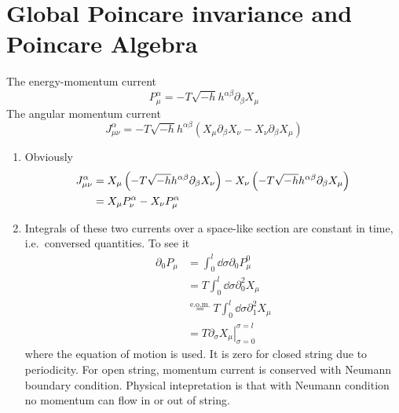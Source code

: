 \section{Global Poincare invariance and Poincare Algebra}
The energy-momentum current
\begin{equation}
	P^\alpha_\mu = - T \sqrt{-h} h^{\alpha \beta} \partial_\beta X_\mu
\end{equation}
The angular momentum current
\begin{equation}
	J^\alpha_{\mu\nu} = - T \sqrt{-h} h^{\alpha\beta} \left( X_\mu \partial_\beta X_\nu - X_\nu \partial_\beta X_\mu \right)
\end{equation}
\begin{enumerate}[label=(\alph*)]
	\item Obviously
		\begin{align}
			J^\alpha_{\mu\nu} &= X_\mu \left( - T \sqrt{-h} h^{\alpha\beta} \partial_\beta X_\nu \right) - X_\nu \left( - T \sqrt{-h} h^{\alpha\beta} \partial_\beta X_\mu \right) \notag \\ 
			&= X_\mu P^\alpha_\nu - X_\nu P^\alpha_\mu 
		\end{align}

	\item 
		Integrals of these two currents over a space-like section are constant in time, i.e.~conversed quantities. To see it
		\begin{align*}
			\partial_0 P_\mu &= \int_0^l \dd{\sigma} \partial_0 P^0_\mu  \\
						&= T \int_0^l \dd{\sigma} \partial_0^2 X_\mu \\
						&\stackrel{\text{e.o.m.}}{=} T \int_0^l \dd{\sigma} \partial_1^2 X_\mu \\
						&= T \left. \partial_\sigma X_\mu \right|_{\sigma=0}^{\sigma=l}
		\end{align*}
		where the equation of motion is used. It is zero for closed string due to periodicity. For open string, momentum current is conserved with Neumann boundary condition. Physical intepretation is that with Neumann condition no momentum can flow in or out of string.


\end{enumerate}
